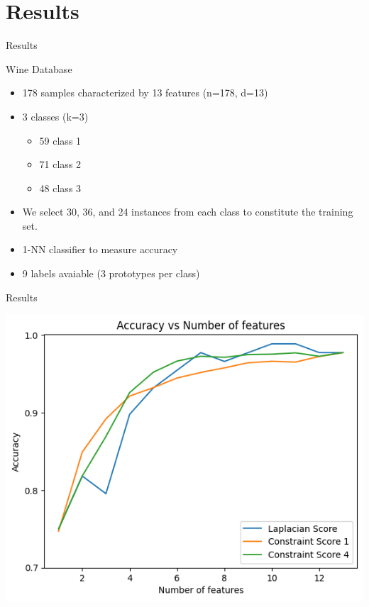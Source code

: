 \documentclass{beamer}
\begin{document}
\section{Results}
\begin{frame}{Results}
    \begin{block}{Wine Database}
        \begin{itemize}
            \item 178 samples characterized by 13 features (n=178, d=13)
            \item 3 classes (k=3)
                \begin{itemize}
                    \item 59 class 1
                    \item 71 class 2
                    \item 48 class 3
                \end{itemize}
            \item We select 30, 36, and 24 instances from each class to constitute the training set.
            \item 1-NN classifier to measure accuracy
            \item 9 labels avaiable (3 prototypes per class)
        \end{itemize}
    \end{block}
\end{frame}
\begin{frame}{Results}
    \begin{center}
    \includegraphics[height=0.8\textheight]{../Images/allscores3.png}
    \end{center}
\end{frame}
\end{document}
